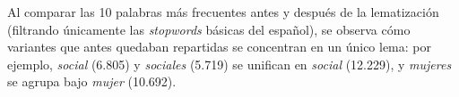 \documentclass[
]{article}
\newcounter{none} %
\begin{document}
Al comparar las 10 palabras más frecuentes antes y después de la
lematización (filtrando únicamente las \emph{stopwords} básicas del
español), se observa cómo variantes que antes quedaban repartidas se
concentran en un único lema: por ejemplo, \emph{social} (6.805) y
\emph{sociales} (5.719) se unifican en \emph{social} (12.229), y
\emph{mujeres} se agrupa bajo \emph{mujer} (10.692).




\end{document}
